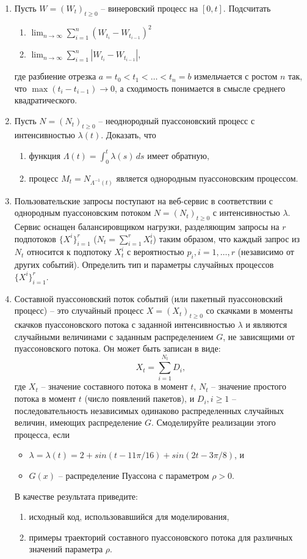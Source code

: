 \documentclass[a4paper,14pt]{extreport}
\renewcommand{\=}[1]{\stackrel{#1}{=}} %
\newcommand{\generaltime}{t \geqslant 0}
\newcommand{\newprocess}[1]{
	\ensuremath{
		#1 = \left(#1 _t\right)_{\generaltime}
	}
}
\begin{document}
\begin{enumerate}
\item Пусть $\newprocess{W}$ -- винеровский процесс на $[0, t]$. Подсчитать 
	\begin{enumerate}
	    \item $\lim_{n \to \infty} \sum_{i=1}^n \left(W_{t_i} - W_{t_{i-1}}\right)^2$
	    \item $\lim_{n \to \infty} \sum_{i=1}^n \left|W_{t_i} - W_{t_{i-1}}\right|$,
	\end{enumerate}
	где разбиение отрезка $a = t_0 < t_1 < \dots < t_n = b$ измельчается с ростом $n$ так, что $\max(t_i - t_{i-1}) \to 0$, а сходимость понимается в смысле среднего квадратического.
	

\item Пусть $\newprocess{N}$ -- неоднородный пуассоновский
процесс с интенсивностью $\lambda(t)$. Доказать, что 
	\begin{enumerate}
	    \item функция $\Lambda(t) = \int_{0}^t \lambda(s) \, ds$ имеет обратную,
	    \item процесс $M_t = N_{\Lambda^{-1}(t)}$ является однородным пуассоновским процессом. 
	\end{enumerate}

\item Пользовательские запросы поступают на веб-сервис
в соответствии с однородным пуассоновским потоком $\newprocess{N}$
с интенсивностью $\lambda$. Сервис оснащен балансировщиком
нагрузки, разделяющим запросы на $r$ подпотоков
$\{X^i\}_{i = 1}^r$ ($N_t = \sum_{i=1}^r X^i_t$)
таким образом, что каждый запрос из $N_t$ 
относится к подпотоку $X^i_t$ с вероятностью
$p_i, i=1, \ldots, r$ (независимо от других событий).
Определить тип и параметры случайных процессов
$\{X^i\}_{i = 1}^r$.

\item Составной пуассоновский поток событий (или пакетный пуассоновский процесс)
-- это случайный процесс $\newprocess{X}$ со скачками в моменты
скачков пуассоновского потока с заданной интенсивностью $\lambda$
и являются случайными величинами с заданным распределением $G$,
не зависящими от пуассоновского потока. Он может быть записан в виде:
\[
X_t = \sum\limits_{i = 1}^{N_t} D_i,
\]
где $X_t$ -- значение составного потока в момент $t$, $N_t$ -- 
значение простого потока в момент $t$ (число появлений пакетов),
и $D_i, i \geqslant 1$ -- последовательность независимых
одинаково распределенных случайных величин, имеющих распределение $G$.
Смоделируйте реализации этого процесса, если
	\begin{itemize}
		\item $\lambda = \lambda(t) = 
		2 + sin (t - 11\pi/16) + sin (2t - 3\pi/8)$, и
		\item $G(x)$ -- распределение Пуассона с параметром $\rho > 0$.
	\end{itemize}
В качестве результата приведите:
\begin{enumerate}
	\item исходный код, использовавшийся для моделирования,
	\item примеры траекторий составного пуассоновского потока
	для различных значений параметра $\rho$.
\end{enumerate}


\end{enumerate}
\end{document}
